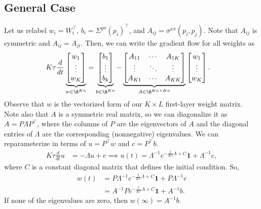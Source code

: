 \documentclass{article}
\begin{document}
\subsection{General Case}
Let us relabel $w_i = W_i^\top$, $b_i = \Sigma^{yx}(p_i)^\top$, and $A_{ij} = \sigma^{xx}(p_i,p_j)$.
Note that $A_{ij}$ is symmetric and $A_{ij} = A_{ji}$.
Then, we can write the gradient flow for all weights as
\begin{align}
  K \tau \frac{d}{dt} \underbrace{\begin{bmatrix} w_1 \\ \vdots \\ w_K \end{bmatrix}}_{w \in \R^{Kn}}
  &= \underbrace{\begin{bmatrix} b_1 \\ \vdots \\ b_k \end{bmatrix}}_{b \in \R^{Kn}} - \underbrace{\begin{bmatrix} A_{11} & \cdots & A_{1K} \\ \vdots & \ddots & \vdots \\ A_{K1} & \cdots & A_{KK} \end{bmatrix}}_{A \in \R^{Kn \times Kn}} \begin{bmatrix} w_1 \\ \vdots \\ w_K \end{bmatrix}.
\end{align}
Observe that $w$ is the vectorized form of our $K \times L$ first-layer weight matrix.
Note also that $A$ is a symmetric real matrix, so we can diagonalize it as $A = P \Lambda P^\top$, where the columns of $P$ are the eigenvectors of $A$ and the diagonal entries of $\Lambda$ are the corresponding (nonnegative) eigenvalues.
We can reparameterize in terms of $u = P^\top w$ and $c = P^\top b$.
\begin{align}
  K \tau \frac{d}{dt} u &= - \Lambda u + c
  \implies
  u(t) = \Lambda^{-1} e^{ -\frac{t}{K \tau} \Lambda + C } \mathbf{1} + \Lambda^{-1} c,
\end{align}
where $C$ is a constant diagonal matrix that defines the initial condition.
So,
\begin{align}
  w(t) 
  &= P \Lambda^{-1} e^{ -\frac{t}{K \tau} \Lambda + C } \mathbf{1} + P \Lambda^{-1} c \\
  &= A^{-1} P e^{ -\frac{t}{K \tau} \Lambda + C } \mathbf{1} + A^{-1} b.
\end{align}
If none of the eigenvalues are zero, then $w(\infty) = A^{-1} b$.
\end{document}
